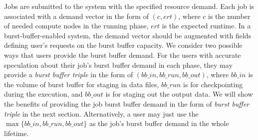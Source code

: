 
Jobs are submitted to the system with the specified resource demand.
Each job is associated with a demand vector in the form of $(c, ert)$,
where $c$ is the number of needed compute nodes in the running phase,
$ert$ is the expected runtime.
In a burst-buffer-enabled system, the demand vector should be augmented
with fields defining user's requests on the burst buffer capacity.
We consider two possible ways that users provide the burst buffer demand.
For the users with accurate speculation about their job's burst buffer demand in each phase,
they may provide a \textit{burst buffer triple} in the form of $(bb\_in, bb\_run, bb\_out)$,
where $bb\_in$ is the volume of burst buffer for staging in data files,
$bb\_run$ is for checkpointing during the execution, and
$bb\_out$ is for staging out the output data.
We will show the benefits of providing the job burst buffer demand in the form of \textit{burst buffer triple} in the next section.
Alternatively, a user may just use the $\max\{bb\_in, bb\_run, bb\_out\}$
as the job's burst buffer demand in the whole lifetime.

